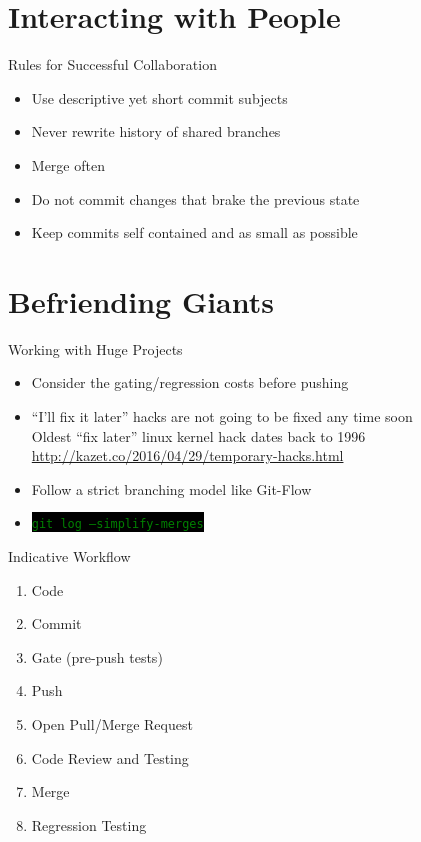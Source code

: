 \documentclass[
14pt,
aspectratio=169,
usenames,
dvipsnames,
x11names]{beamer}
\newcommand{\code}[1]{{\small\colorbox{black}{\textcolor{green}{\texttt{#1}}}}}
\begin{document}
\section{Interacting with People}

\begin{frame}{Rules for Successful Collaboration}
  \begin{itemize}[<+->] \setlength{\itemsep}{\fill}
  \item Use \alert{descriptive yet short} commit subjects
  \item \alert{Never} rewrite history of shared branches
  \item \alert{Merge} often
  \item \alert{Do not} commit changes that brake the previous state
  \item Keep commits \alert{self contained} and as small as possible
  \end{itemize}
\end{frame}

\section{Befriending Giants}

\begin{frame}{Working with Huge Projects}
  \begin{itemize}[<+->] \setlength{\itemsep}{\fill}
  \item Consider the \alert{gating/regression costs} before pushing
  \item ``I'll fix it later'' hacks are not going to be fixed any time soon\\[1ex]
    Oldest \alert{``fix later''} linux kernel hack dates back to \alert{1996} \url{http://kazet.co/2016/04/29/temporary-hacks.html}
  \item Follow a strict branching model like \alert{Git-Flow}
  \item \code{git log --simplify-merges}
  \end{itemize}
\end{frame}

\begin{frame}{Indicative Workflow}
  \begin{multicols}{2}
    \begin{enumerate}[<+->] \setlength{\itemsep}{\fill}
    \item Code
    \item Commit
    \item Gate (pre-push tests)
    \item Push
    \item Open Pull/Merge Request
    \item Code Review and Testing
    \item Merge
    \item Regression Testing
    \end{enumerate}
  \end{multicols}
\end{frame}
\end{document}
